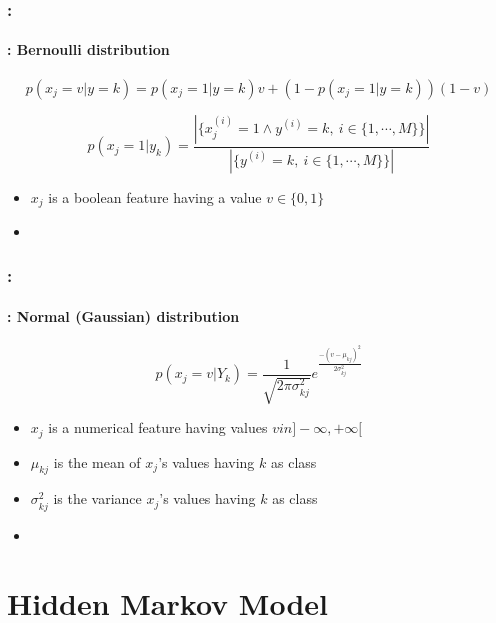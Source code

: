 \documentclass[xcolor=table]{beamer}
\begin{document}
\begin{frame}
	\frametitle{\insertshortsubtitle: \insertsection}
	\framesubtitle{\insertsubsection: Bernoulli distribution}
	
	\[p(x_j=v|y=k) = p(x_j=1|y=k) v + (1-p(x_j=1|y=k)) (1-v)\]
	
	\vfill
	
	\[p(x_j=1|y_k) = \frac{|\{x_j^{(i)} = 1 \wedge y^{(i)} = k,\ i \in \{1, \cdots, M\}\}|}{|\{y^{(i)} = k,\ i \in \{1, \cdots, M\}\}|}\]
	
	\vfill
	
	\begin{itemize}
		\item $x_j$ is a boolean feature having a value $v \in \{0, 1\}$
		\item {}
	\end{itemize}
	
	
\end{frame}

\begin{frame}
	\frametitle{\insertshortsubtitle: \insertsection}
	\framesubtitle{\insertsubsection: Normal (Gaussian) distribution}
	
	\[p(x_j = v|Y_k) = \frac{1}{\sqrt{2\pi \sigma_{kj}^2}} e^\frac{-(v-\mu_{kj})^2}{2 \sigma_{kj}^2}\]
	
	\vfill
	
	\begin{itemize}
		\item $x_j$ is a numerical feature having values $ v in ]-\infty, +\infty[ $
		\item $\mu_{kj}$ is the mean of $x_j$'s values having $k$ as class
		\item $\sigma_{kj}^2$ is the variance $x_j$'s values having $k$ as class
		\item {}
	\end{itemize}
	
	
\end{frame}

\section{Hidden Markov Model}
\end{document}
